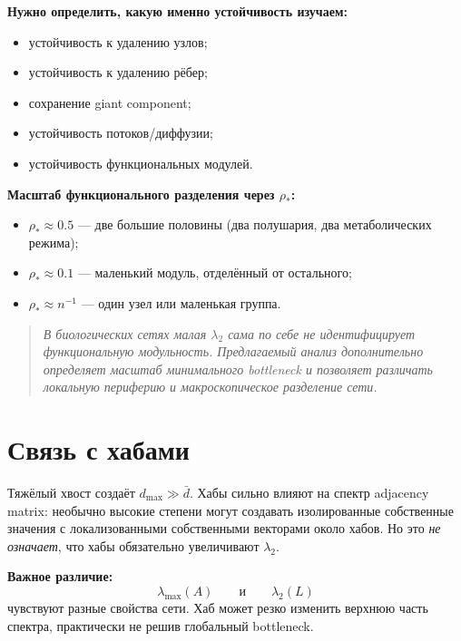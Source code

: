 \documentclass[11pt,a4paper]{article}
\theoremstyle{plain}
\theoremstyle{definition}
\theoremstyle{remark}
\newcommand{\dmax}{d_{\max}}
\newcommand{\dbar}{\bar d}
\newcommand{\lamtwo}{\lambda_2}
\begin{document}
\textbf{Нужно определить, какую именно устойчивость изучаем:}
\begin{itemize}[leftmargin=*]
\item устойчивость к удалению узлов;
\item устойчивость к удалению рёбер;
\item сохранение giant component;
\item устойчивость потоков/диффузии;
\item устойчивость функциональных модулей.
\end{itemize}

\textbf{Масштаб функционального разделения через $\rho_*$:}
\begin{itemize}[leftmargin=*]
\item $\rho_*\approx 0.5$ --- две большие половины (два полушария, два
метаболических режима);
\item $\rho_*\approx 0.1$ --- маленький модуль, отделённый от остального;
\item $\rho_*\approx n^{-1}$ --- один узел или маленькая группа.
\end{itemize}

\begin{quote}
\itshape
В биологических сетях малая $\lamtwo$ сама по себе не идентифицирует
функциональную модульность. Предлагаемый анализ дополнительно определяет
масштаб минимального bottleneck и позволяет различать локальную периферию и
макроскопическое разделение сети.
\end{quote}

\section{Связь с хабами}
\label{sec:hubs}

Тяжёлый хвост создаёт $\dmax\gg\dbar$. Хабы сильно влияют на спектр adjacency
matrix: необычно высокие степени могут создавать изолированные собственные
значения с локализованными собственными векторами около хабов. Но это
\emph{не означает}, что хабы обязательно увеличивают $\lamtwo$.

\textbf{Важное различие:}
\begin{equation}
\lambda_{\max}(A)\qquad\text{и}\qquad\lamtwo(L)
\end{equation}
чувствуют разные свойства сети. Хаб может резко изменить верхнюю часть
спектра, практически не решив глобальный bottleneck.

\end{document}
